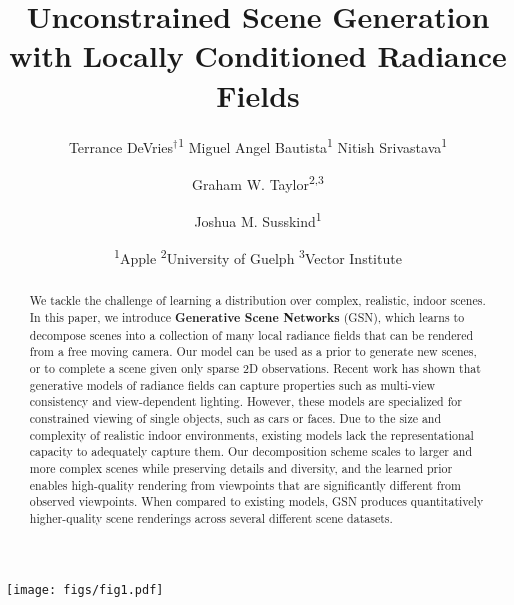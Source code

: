 \documentclass[10pt,twocolumn,letterpaper]{article}
\begin{document}
\title{Unconstrained Scene Generation with Locally Conditioned Radiance Fields}

\author{Terrance DeVries$^\dagger$\textsuperscript{1} \quad \qquad Miguel Angel  Bautista\textsuperscript{1} \quad \qquad Nitish Srivastava\textsuperscript{1}
\and
Graham W. Taylor\textsuperscript{2,3}
\and
Joshua M. Susskind\textsuperscript{1}
\and
\textsuperscript{1}Apple\qquad
\textsuperscript{2}University of Guelph\qquad
\textsuperscript{3}Vector Institute
}
 
\maketitle
\ificcvfinal\thispagestyle{empty}\fi
 
\begin{strip}
\centering
\vspace{-4em}
\texttt{[image: figs/fig1.pdf]}
\label{fig:flythrough}
\end{strip}


\begin{abstract}
\vspace{-1.0em}
We tackle the challenge of learning a distribution over complex, realistic, indoor scenes. In this paper,
we introduce \textbf{Generative Scene Networks} (GSN), which learns to decompose scenes into a collection of many local radiance fields that can be rendered from a free moving camera. Our model can be used as a prior to generate new scenes, or to complete a scene given only sparse 2D observations.
Recent work has shown that generative models of radiance fields can capture properties such as multi-view consistency and view-dependent lighting. However, these models are specialized for constrained viewing of single objects, such as cars or faces.
Due to the size and complexity of realistic indoor environments, existing models lack the representational capacity to adequately capture them.
Our decomposition scheme scales to larger and more complex scenes while preserving details and diversity, and the learned prior enables high-quality rendering from viewpoints that are significantly different from observed viewpoints. When compared to existing models, GSN produces quantitatively higher-quality scene renderings  across several different scene datasets. 
\end{abstract}
\end{document}
